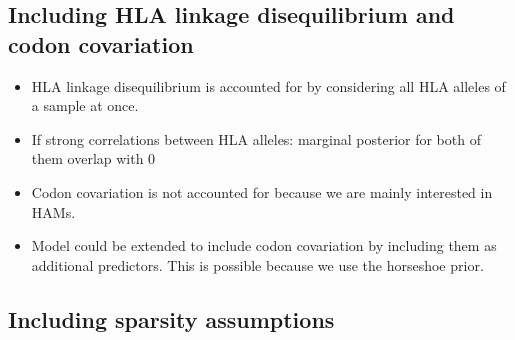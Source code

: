 \documentclass[fleqn,11pt]{SelfArx} %
\begin{document}
\subsection*{Including HLA linkage disequilibrium and codon covariation}

\begin{itemize}
  \item HLA linkage disequilibrium is accounted for by considering all HLA alleles
    of a sample at once.
  \item If strong correlations between HLA alleles: marginal posterior for both of them
    overlap with 0
  \item Codon covariation is not accounted for because we are mainly interested in HAMs.
  \item Model could be extended to include codon covariation by including them as additional
    predictors. This is possible because we use the horseshoe prior.
\end{itemize}

\subsection*{Including sparsity assumptions}
\end{document}
